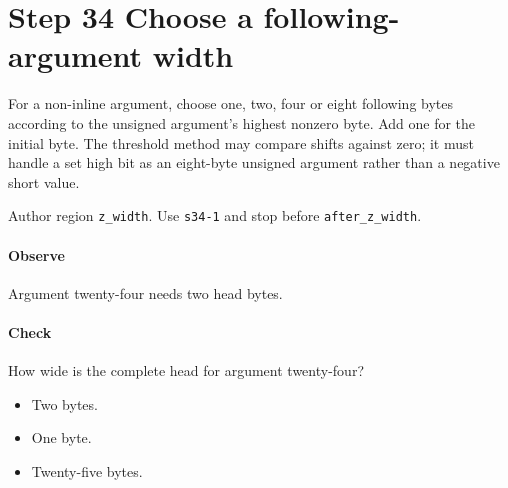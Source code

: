\section{Step 34 Choose a following-argument width}\label{cbor-s34}
For a non-inline argument, choose one, two, four or eight following bytes according to the unsigned argument's highest nonzero byte. Add one for the initial byte. The threshold method may compare shifts against zero; it must handle a set high bit as an eight-byte unsigned argument rather than a negative short value.

Author region \texttt{z\_width}. Use \texttt{s34-1} and stop before \texttt{after\_z\_width}.

\paragraph{Observe} Argument twenty-four needs two head bytes.

\paragraph{Check} How wide is the complete head for argument twenty-four?
\begin{itemize}
\item[A.] Two bytes.
\item[B.] One byte.
\item[C.] Twenty-five bytes.
\end{itemize}
